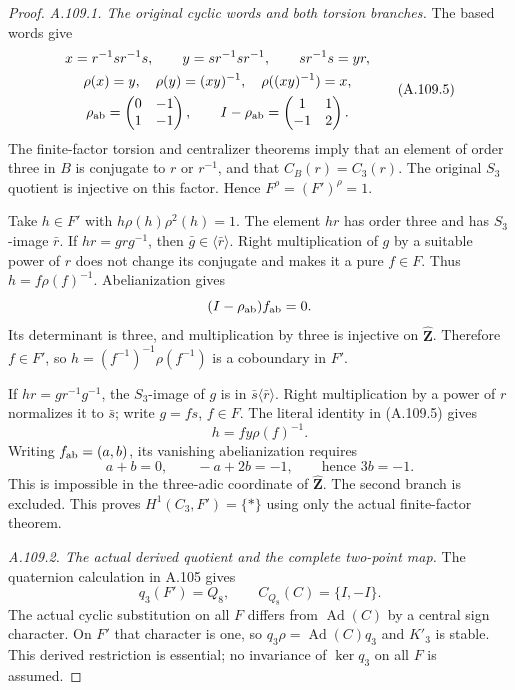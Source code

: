 \begin{proof}
\emph{A.109.1. The original cyclic words and both torsion branches.}
The based words give
\[
 \begin{gathered}
 x=r^{-1}sr^{-1}s,\qquad y=sr^{-1}sr^{-1},\qquad
 sr^{-1}s=yr,\\
 \rho(x)=y,\quad \rho(y)=(xy)^{-1},\quad
 \rho((xy)^{-1})=x,\\
 \rho_{\rm ab}=\begin{pmatrix}0&-1\\1&-1\end{pmatrix},
 \qquad
 I-\rho_{\rm ab}=\begin{pmatrix}1&1\\-1&2\end{pmatrix}.
 \end{gathered}
 \tag{A.109.5}
\]
The finite-factor torsion and centralizer theorems
\cite[Theorems A' and B']{A_HR1985} imply that an element of order
three in \(B\) is conjugate to \(r\) or \(r^{-1}\), and that
\(C_B(r)=C_3(r)\). The original \(S_3\) quotient is injective on
this factor. Hence \(F^\rho=(F')^\rho=1\).

Take \(h\in F'\) with \(h\rho(h)\rho^2(h)=1\). The element \(hr\)
has order three and has \(S_3\)-image \(\bar r\).
If \(hr=grg^{-1}\), then \(\bar g\in\langle\bar r\rangle\).
Right multiplication of \(g\) by a suitable power of \(r\)
does not change its conjugate and makes it a pure \(f\in F\).
Thus \(h=f\rho(f)^{-1}\). Abelianization gives
\[
 (I-\rho_{\rm ab})f_{\rm ab}=0.
 \]
Its determinant is three, and multiplication by three is injective
on \(\widehat{\mathbf Z}\). Therefore \(f\in F'\), so
\(h=(f^{-1})^{-1}\rho(f^{-1})\) is a coboundary in \(F'\).

If \(hr=gr^{-1}g^{-1}\), the \(S_3\)-image of \(g\) is in
\(\bar s\langle\bar r\rangle\). Right multiplication by a power of
\(r\) normalizes it to \(\bar s\); write \(g=fs\), \(f\in F\).
The literal identity in (A.109.5) gives
\[
 h=f y\rho(f)^{-1}.
 \]
Writing \(f_{\rm ab}=(a,b)\), its vanishing abelianization requires
\[
 a+b=0,\qquad -a+2b=-1,\qquad\text{hence }3b=-1.
 \]
This is impossible in the three-adic coordinate of
\(\widehat{\mathbf Z}\). The second branch is excluded. This proves
\(H^1(C_3,F')=\{*\}\) using only the actual finite-factor theorem.

\emph{A.109.2. The actual derived quotient and the complete two-point map.}
The quaternion calculation in A.105 gives
\[
 q_3(F')=Q_8,\qquad C_{Q_8}(C)=\{I,-I\}.
 \tag{A.109.6}
\]
The actual cyclic substitution on all \(F\) differs from
\(\operatorname{Ad}(C)\) by a central sign character. On \(F'\)
that character is one, so \(q_3\rho=\operatorname{Ad}(C)q_3\)
and \(K'_3\) is stable. This derived restriction is essential;
no invariance of \(\ker q_3\) on all \(F\) is assumed.


\end{proof}
